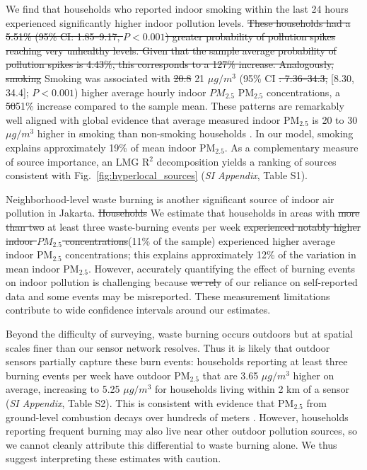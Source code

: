 \documentclass[reqno,12pt,notitlepage]{article}
\providecommand{\DIFadd}[1]{{\protect\color{BLUE}#1}} %
\providecommand{\DIFdel}[1]{{\protect\color{red}\sout{#1}}} %
\providecommand{\DIFaddbegin}{} %
\providecommand{\DIFaddend}{} %
\providecommand{\DIFdelbegin}{} %
\providecommand{\DIFdelend}{} %
\begin{document}
We find that households who reported indoor smoking within the last 24 hours experienced significantly higher indoor pollution levels. \DIFdelbegin \DIFdel{These households had a 5.51\% (95\% CI: 1.85--9.17, $P < 0.001$) greater probability of pollution spikes reaching very unhealthy levels. Given that the sample average probability of pollution spikes is 4.43\%, this corresponds to a 127\% increase. Analogously, smoking }\DIFdelend \DIFaddbegin \DIFadd{Smoking }\DIFaddend was associated with \DIFdelbegin \DIFdel{20.8 }\DIFdelend \DIFaddbegin \DIFadd{21 }\DIFaddend $\mu g/m^3$ (95\% CI \DIFdelbegin \DIFdel{: 7.36--34.3, }\DIFdelend \DIFaddbegin \DIFadd{[8.30, 34.4]; }\DIFaddend $P < 0.001$) higher average hourly indoor \DIFdelbegin \DIFdel{$PM_{2.5}$ }\DIFdelend \DIFaddbegin \DIFadd{PM$_{2.5}$ }\DIFaddend concentrations, a \DIFdelbegin \DIFdel{50}\DIFdelend \DIFaddbegin \DIFadd{51}\DIFaddend \% increase compared to the sample mean. \DIFaddbegin \DIFadd{These patterns are remarkably well aligned with global evidence that average measured indoor PM$_{2.5}$ is 20 to 30 $\mu g / m^3$ higher in smoking than non-smoking households \citep{Semple2015}. In our model, smoking explains approximately 19\% of mean indoor PM$_{2.5}$. As a complementary measure of source importance, an LMG R$^2$ decomposition yields a ranking of sources consistent with Fig.\ \ref{fig:hyperlocal_sources} (\textit{SI Appendix}, Table S1).
}\DIFaddend 

Neighborhood-level waste burning is another significant source of indoor air pollution in Jakarta. \DIFdelbegin \DIFdel{Households }\DIFdelend \DIFaddbegin \DIFadd{We estimate that households }\DIFaddend in areas with \DIFdelbegin \DIFdel{more than two }\DIFdelend \DIFaddbegin \DIFadd{at least three }\DIFaddend waste-burning events per week \DIFdelbegin \DIFdel{experienced notably higher indoor $PM_{2.5}$ concentrations}\DIFdelend \DIFaddbegin \DIFadd{(11\% of the sample) experienced higher average indoor PM$_{2.5}$ concentrations; this explains approximately 12\% of the variation in mean indoor PM$_{2.5}$}\DIFaddend . However, accurately quantifying the effect of burning events on indoor pollution is challenging because \DIFdelbegin \DIFdel{we rely }\DIFdelend \DIFaddbegin \DIFadd{of our reliance }\DIFaddend on self-reported data and some events may be misreported. These measurement limitations contribute to wide confidence intervals around our estimates.

\DIFaddbegin \DIFadd{Beyond the difficulty of surveying, waste burning occurs outdoors but at spatial scales finer than our sensor network resolves. Thus it is likely that outdoor sensors partially capture these burn events: households reporting at least three burning events per week have outdoor PM$_{2.5}$ that are 3.65 $\mu g/m^3$ higher on average, increasing to 5.25 $\mu g/m^3$ for households living within 2 km of a sensor (\textit{SI Appendix}, Table S2). This is consistent with evidence that PM$_{2.5}$ from ground-level combustion decays over hundreds of meters \citep{WHO2013REVIHAAP}. However, households reporting frequent burning may also live near other outdoor pollution sources, so we cannot cleanly attribute this differential to waste burning alone. We thus suggest interpreting these estimates with caution.
}
\end{document}
